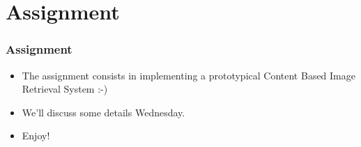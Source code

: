 \documentclass[10pt]{beamer}
\begin{document}
\section{Assignment}
\label{sec:ass}

\begin{frame}
  \frametitle{Assignment}
  \begin{itemize}
  \item The assignment consists in implementing a prototypical Content Based Image Retrieval System :-)
  \item We'll discuss some details Wednesday.
  \item Enjoy!
  \end{itemize}
\end{frame}
\end{document}
